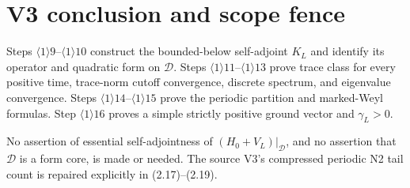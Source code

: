 \documentclass[11pt,a4paper]{article}
\newcommand{\D}{\mathcal D}
\begin{document}
\QedStep

\section{V3 conclusion and scope fence}

\begin{resultbox}
Steps $\langle1\rangle9$--$\langle1\rangle10$ construct the bounded-below
self-adjoint $K_L$ and identify its operator and quadratic form on $\D$.
Steps $\langle1\rangle11$--$\langle1\rangle13$ prove trace class for every
positive time, trace-norm cutoff convergence, discrete spectrum, and eigenvalue
convergence.  Steps $\langle1\rangle14$--$\langle1\rangle15$ prove the periodic
partition and marked-Weyl formulas.  Step $\langle1\rangle16$ proves a simple
strictly positive ground vector and $\gamma_L>0$.

No assertion of essential self-adjointness of $(H_0+V_L)|_{\D}$, and no assertion
that $\D$ is a form core, is made or needed.  The source V3's compressed periodic
N2 tail count is repaired explicitly in (2.17)--(2.19).
\end{resultbox}
\end{document}
